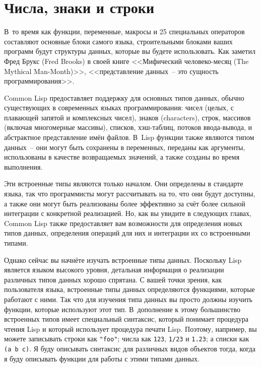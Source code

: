 \chapter{Числа, знаки и строки}
\label{ch:10}

\thispagestyle{empty}

В~то время как функции, переменные, макросы и 25 специальных операторов составляют
основные блоки самого языка, строительными блоками ваших программ будут структуры данных,
которые вы будете использовать.  Как заметил Фред Брукс (Fred Brooks) в своей книге
<<Мифический человеко-месяц (The Mythical Man-Month)>>, <<представление данных~-- это
сущность программирования>>.

Common Lisp предоставляет поддержку для основных типов данных, обычно существующих в
современных языках программирования: чисел (целых, с плавающей запятой и комплексных
чисел), знаков (characters), строк, массивов
(включая многомерные массивы), списков, хэш-таблиц, потоков ввода-вывода, и абстрактное
представление имён файлов.  В~Lisp функции также являются типом данных~-- они могут быть
сохранены в переменных, переданы как аргументы, использованы в качестве возвращаемых
значений, а также созданы во время выполнения.

Эти встроенные типы являются только началом.  Они определены в стандарте языка, так что
программисты могут рассчитывать на то, что они будут доступны, а также они могут быть
реализованы более эффективно за счёт более сильной интеграции с конкретной реализацией.
Но, как вы увидите в следующих главах, Common Lisp также предоставляет вам возможности для
определения новых типов данных, определения операций для них и интеграции их со
встроенными типами.

Однако сейчас вы начнёте изучать встроенные типы данных.  Поскольку Lisp является языком
высокого уровня, детальная информация о реализации различных типов данных хорошо спрятана.
С вашей точки зрения, как пользователя языка, встроенные типы данных определяются
функциями, которые работают с ними.  Так что для изучения типа данных вы просто должны
изучить функции, которые используют этот тип.  В~дополнение к этому большинство
встроенных типов имеет специальный синтаксис, который понимает процедура чтения Lisp и
который использует процедура печати Lisp.  Поэтому, например, вы можете записывать строки
как \lstinline{"foo"}; числа как \lstinline{123}, \lstinline{1/23} и \lstinline{1.23}; а списки как 
\lstinline{(a b c)}.  Я буду описывать синтаксис для различных видов объектов тогда, когда я буду
описывать функции для работы с этими типами данных.

